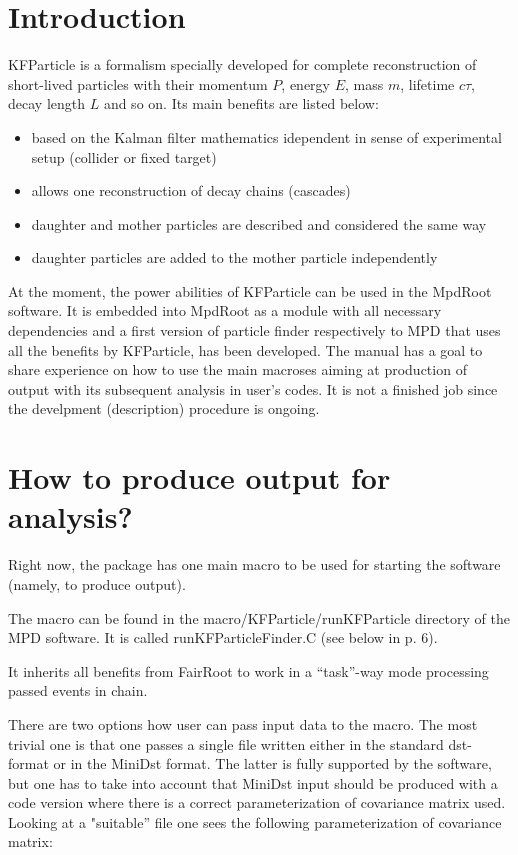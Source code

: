 \documentclass[8pt,a5paper, oldfontcommands]{memoir}
\begin{document}
\section{Introduction}
\thispagestyle{plain}

KFParticle is a formalism specially developed for complete reconstruction of short-lived particles with their
momentum $P$, energy $E$, mass $m$, lifetime $c\tau$, decay length $L$ and so on.
Its main benefits are listed below:
\begin{itemize}
\item based on the Kalman filter mathematics idependent in sense of experimental setup (collider or fixed target)
\item allows one reconstruction of decay chains (cascades)
\item daughter and mother particles are described and considered the same way
\item daughter particles are added to the mother particle independently
\end{itemize}

At the moment, the power abilities of KFParticle can be used in the MpdRoot software. It is embedded into MpdRoot as a module with all necessary dependencies
and a first version of particle finder respectively to MPD that uses all the benefits by KFParticle, has been developed.
The manual has a goal to share experience on how to use the main macroses aiming at production of output with its subsequent analysis in user's codes.
It is not a finished job since the develpment (description) procedure is ongoing.  

\newpage
\section{How to produce output for analysis?}
\thispagestyle{plain}

Right now, the package has one main macro to be used for starting the software (namely, to produce output).

The macro can be found in the {\color{blue} macro/KFParticle/runKFParticle} directory of the MPD software.
It is called {\color{blue} runKFParticleFinder.C} (see below in p. 6).

It inherits all benefits from FairRoot to work in a ``task''-way mode processing passed events in chain.

There are two options how user can pass input data to the macro. The most trivial one is that one passes a single file written either
in the {\color{red} standard dst-format} or in the {\color{blue} MiniDst format}. The latter is fully supported by the software,
but one has to take into account that MiniDst input should be produced with a code version where there is a correct parameterization of covariance matrix used.
Looking at a "suitable'' file one sees the following parameterization of covariance matrix:
\end{document}
